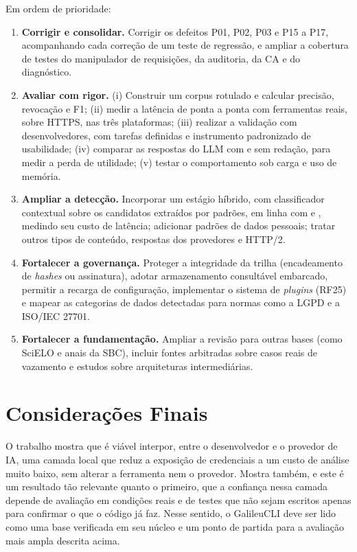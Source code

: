 Em ordem de prioridade:

\begin{enumerate}
    \item \textbf{Corrigir e consolidar.} Corrigir os defeitos P01, P02, P03 e P15 a P17, acompanhando cada correção de um teste de regressão, e ampliar a cobertura de testes do manipulador de requisições, da auditoria, da CA e do diagnóstico.
    \item \textbf{Avaliar com rigor.} (i) Construir um corpus rotulado e calcular precisão, revocação e F1; (ii) medir a latência de ponta a ponta com ferramentas reais, sobre HTTPS, nas três plataformas; (iii) realizar a validação com desenvolvedores, com tarefas definidas e instrumento padronizado de usabilidade; (iv) comparar as respostas do LLM com e sem redação, para medir a perda de utilidade; (v) testar o comportamento sob carga e uso de memória.
    \item \textbf{Ampliar a detecção.} Incorporar um estágio híbrido, com classificador contextual sobre os candidatos extraídos por padrões, em linha com  e , medindo seu custo de latência; adicionar padrões de dados pessoais; tratar outros tipos de conteúdo, respostas dos provedores e HTTP/2.
    \item \textbf{Fortalecer a governança.} Proteger a integridade da trilha (encadeamento de \textit{hashes} ou assinatura), adotar armazenamento consultável embarcado, permitir a recarga de configuração, implementar o sistema de \textit{plugins} (RF25) e mapear as categorias de dados detectadas para normas como a LGPD e a ISO/IEC 27701.
    \item \textbf{Fortalecer a fundamentação.} Ampliar a revisão para outras bases (como SciELO e anais da SBC), incluir fontes arbitradas sobre casos reais de vazamento e estudos sobre arquiteturas intermediárias.
\end{enumerate}

\section{Considerações Finais}

O trabalho mostra que é viável interpor, entre o desenvolvedor e o provedor de IA, uma camada local que reduz a exposição de credenciais a um custo de análise muito baixo, sem alterar a ferramenta nem o provedor. Mostra também, e este é um resultado tão relevante quanto o primeiro, que a confiança nessa camada depende de avaliação em condições reais e de testes que não sejam escritos apenas para confirmar o que o código já faz. Nesse sentido, o GalileuCLI deve ser lido como uma base verificada em seu núcleo e um ponto de partida para a avaliação mais ampla descrita acima.
